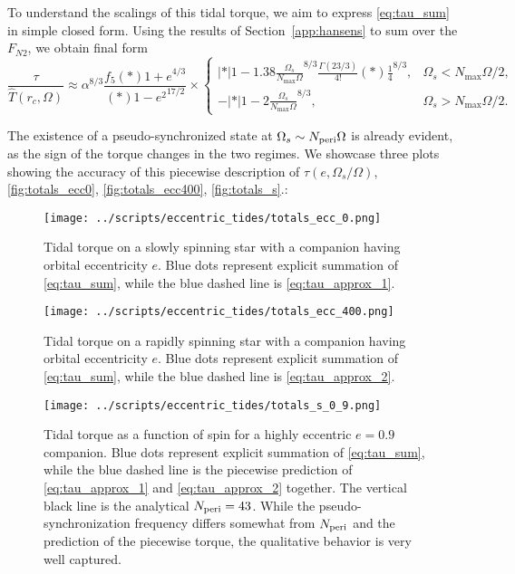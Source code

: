 \documentclass[
        fleqn,
        usenatbib,
        referee,
    ]{mnras}
\newcommand*{\abs}[1]{\left|#1\right|}
\newcommand*{\p}[1]{\left(#1\right)}
\begin{document}
To understand the scalings of this tidal torque, we aim to express
\autoref{eq:tau_sum} in simple closed form. Using the results of
Section~\ref{app:hansens} to sum over the $F_{N2}$, we obtain final form
\begin{equation}
    \frac{\tau}{\hat{T}\p{r_c, \Omega}} \approx \alpha^{8/3}
        \frac{f_5\p*{1 + e}^{4/3}}{\p*{1 - e^2}^{17/2}} \times
    \begin{cases}
        \abs*{1 - 1.38\frac{\Omega_s}{N_{\max}\Omega}}^{8/3}
            \frac{\Gamma(23/3)}{4!}\p*{\frac{1}{4}}^{8/3},
            & \Omega_s < N_{\max}\Omega / 2,\\[5pt]
        -\abs*{1 - 2\frac{\Omega_s}{N_{\max}\Omega}}^{8/3},
            & \Omega_s > N_{\max}\Omega / 2.
    \end{cases}\label{eq:tau_approx}
\end{equation}

The existence of a pseudo-synchronized state at $\Omega_s \sim N_{\rm peri}
\Omega$ is already evident, as the sign of the torque changes in the two
regimes. We showcase three plots showing the accuracy of this piecewise
description of $\tau\p{e, \Omega_s / \Omega}$, \autoref{fig:totals_ecc0},
\autoref{fig:totals_ecc400}, \autoref{fig:totals_s}.:
\begin{figure}
    \centering
    \texttt{[image: ../scripts/eccentric\_tides/totals\_ecc\_0.png]}
    \caption{Tidal torque on a slowly spinning star with a companion having
    orbital eccentricity $e$. Blue dots represent explicit summation of
    \autoref{eq:tau_sum}, while the blue dashed line is
    \autoref{eq:tau_approx_1}.}\label{fig:totals_ecc0}
\end{figure}
\begin{figure}
    \centering
    \texttt{[image: ../scripts/eccentric\_tides/totals\_ecc\_400.png]}
    \caption{Tidal torque on a rapidly spinning star with a companion having
    orbital eccentricity $e$. Blue dots represent explicit summation of
    \autoref{eq:tau_sum}, while the blue dashed line is
    \autoref{eq:tau_approx_2}.}\label{fig:totals_ecc400}
\end{figure}
\begin{figure}
    \centering
    \texttt{[image: ../scripts/eccentric\_tides/totals\_s\_0\_9.png]}
    \caption{Tidal torque as a function of spin for a highly eccentric $e = 0.9$
    companion. Blue dots represent explicit summation of \autoref{eq:tau_sum},
    while the blue dashed line is the piecewise prediction of
    \autoref{eq:tau_approx_1} and \autoref{eq:tau_approx_2} together. The
    vertical black line is the analytical $N_{\rm peri} = 43$. While the
    pseudo-synchronization frequency differs somewhat from $N_{\rm peri}$ and
    the prediction of the piecewise torque, the qualitative behavior is very
    well captured.}\label{fig:totals_s}
\end{figure}
\end{document}
